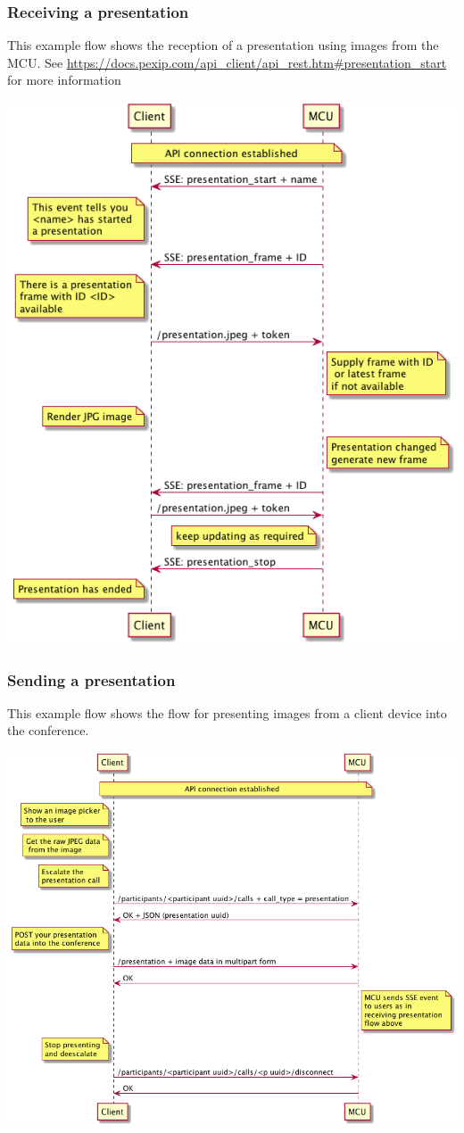 \documentclass[a4paper,11pt]{article}
\begin{document}
\subsubsection{Receiving a presentation}
\label{sec:orgheadline13}

This example flow shows the reception of a presentation using images
from the MCU.  See
\url{https://docs.pexip.com/api_client/api_rest.htm#presentation_start} for
more information

\includegraphics[width=.9\linewidth]{images/presentation_jpeg_rx_sequence.png}

\subsubsection{Sending a presentation}
\label{sec:orgheadline14}

This example flow shows the flow for presenting images from a client
device into the conference.

\includegraphics[width=.9\linewidth]{images/presentation_jpeg_tx_sequence.png}
\end{document}
